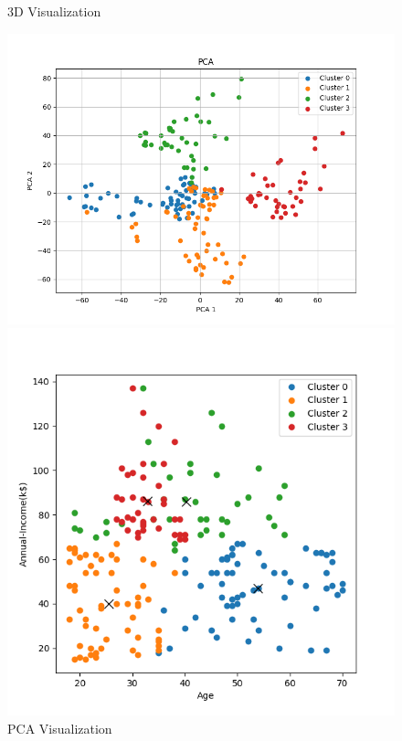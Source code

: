 \documentclass[8pt]{article}
\begin{document}
\begin{figure}[H]
\begin{minipage}{0.32\textwidth}
        \caption{3D Visualization}
        \label{fig: 3D k4 com con min20}
    \end{minipage}
    \hfill
    \begin{minipage}{0.32\textwidth}
        \centering
        \includegraphics[width=\textwidth]{./Prob4/out/task3_2_com/images/PCA_k4.png}
        \caption{PCA Visualization}
        \label{PCA k4 com con min20}
    \end{minipage}
    \hfill
    \begin{minipage}{0.32\textwidth}
        \centering
        \includegraphics[width=\textwidth]{./Prob4/out/task3_2_com/images/cluster_result_k4_0_1.png}

\end{minipage}
\end{figure}
\end{document}
